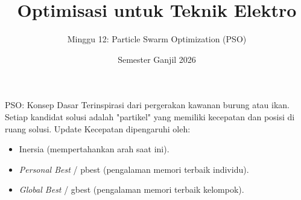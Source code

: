 \documentclass[aspectratio=169]{beamer}
\title{Optimisasi untuk Teknik Elektro}\subtitle{Minggu 12: Particle Swarm Optimization (PSO)}
\date{Semester Ganjil 2026}
\begin{document}
\begin{frame}\titlepage\end{frame}
\begin{frame}{PSO: Konsep Dasar}
Terinspirasi dari pergerakan kawanan burung atau ikan.
Setiap kandidat solusi adalah "partikel" yang memiliki kecepatan dan posisi di ruang solusi.
Update Kecepatan dipengaruhi oleh:
\begin{itemize}
\item Inersia (mempertahankan arah saat ini).
\item \textit{Personal Best} / pbest (pengalaman memori terbaik individu).
\item \textit{Global Best} / gbest (pengalaman memori terbaik kelompok).
\end{itemize}
\end{frame}
\end{document}
